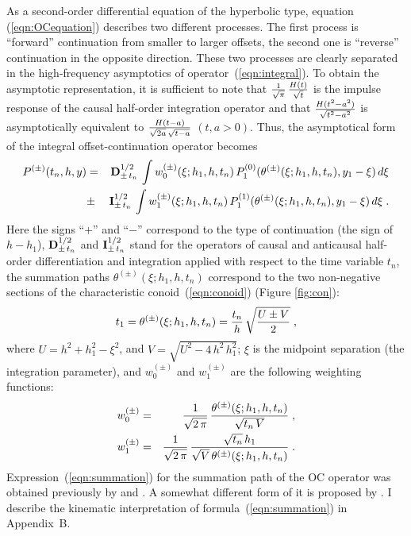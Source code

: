 As a second-order differential equation of the hyperbolic type,
equation (\ref{eqn:OCequation}) describes two different processes. The
first process is ``forward'' continuation from smaller to larger
offsets, the second one is ``reverse'' continuation in the opposite
direction.  These two processes are clearly separated in the
high-frequency asymptotics of operator~(\ref{eqn:integral}). To obtain
the asymptotic representation, it is sufficient to note that ${1
  \over \sqrt{\pi}}\, {H(t) \over \sqrt{t}}$ is the impulse response
of the causal half-order integration operator and that $H(t^2-a^2)
\over \sqrt{t^2-a^2}$ is asymptotically equivalent to $H(t-a) \over
{\sqrt{2a}\,\sqrt{t-a}}$ $(t, a >0)$.  Thus, the asymptotical form of
the integral offset-continuation operator becomes
\begin{eqnarray}
P^{(\pm)}(t_n,h,y) & = &
{\bf D}^{1/2}_{\pm\,t_n}\,\int w^{(\pm)}_0(\xi;h_1,h,t_n)\,
P^{(0)}_1(\theta^{(\pm)}(\xi;h_1,h,t_n),y_1-\xi)\,d\xi
\nonumber \\ 
& \pm  & 
{\bf I}^{1/2}_{\pm\,t_n}\,\int w^{(\pm)}_1(\xi;h_1,h,t_n)\,
P^{(1)}_1(\theta^{(\pm)}(\xi;h_1,h,t_n),y_1-\xi)\,d\xi\;.
\label{eqn:asintegral} 
\end{eqnarray}
Here the signs ``$+$'' and ``$-$'' correspond to the type of
continuation (the sign of ${h-h_1}$), ${\bf D}^{1/2}_{\pm\,t_n}$ and
${\bf I}^{1/2}_{\pm\,t_n}$ stand for the operators of causal and
anticausal half-order differentiation and integration applied with
respect to the time variable $t_n$, the summation paths
$\theta^{(\pm)}(\xi;h_1,h,t_n)$ correspond to the two non-negative
sections of the characteristic conoid~(\ref{eqn:conoid}) (Figure
\ref{fig:con}):
\begin{equation}
t_1=\theta^{(\pm)}(\xi;h_1,h,t_n)=
{t_n \over h}\,\sqrt{{U \pm V} \over 2 }\;,
\label{eqn:summation}
\end{equation}
where $U=h^2+h_1^2-\xi^2$, and $V=\sqrt{U^2-4\,h^2\,h_1^2}$; $\xi$ is
the midpoint separation (the integration parameter), and $w^{(\pm)}_0$
and $w^{(\pm)}_1$ are the following weighting functions:
\begin{eqnarray}
w^{(\pm)}_0 & = & {1 \over \sqrt{2\,\pi}}\,
{\theta^{(\pm)}(\xi;h_1,h,t_n) \over \sqrt{t_n\,V}}\;,
\label{eqn:w0} \\
w^{(\pm)}_1 & = & {1 \over \sqrt{2\,\pi}}\,
{{\sqrt{t_n}\, h_1} \over {\sqrt{V}\,\theta^{(\pm)}(\xi;h_1,h,t_n)}}\;. 
\label{eqn:w1} 
\end{eqnarray}  
Expression~(\ref{eqn:summation}) for the summation path of the OC
operator was obtained previously by \cite{stovas} and
\cite{SEG-1994-1541}. A somewhat different form of it is proposed by
\cite{GEO61-06-18461858}. I describe the kinematic interpretation
of formula~(\ref{eqn:summation}) in Appendix~B.


